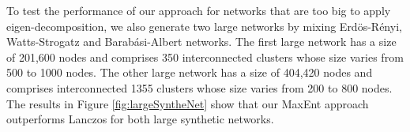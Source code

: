 \documentclass[letterpaper]{article} %
\begin{document}
To test the performance of our approach for networks that are too big to apply eigen-decomposition, we also generate two large networks by mixing Erd{\"o}s-R{\'e}nyi, Watts-Strogatz and Barabási-Albert networks. The first large network has a size of  201,600 nodes and comprises 350 interconnected clusters whose size varies from 500 to 1000 nodes. The other large network has a size of 404,420 nodes and comprises interconnected 1355 clusters whose size varies from 200 to 800 nodes. The results in Figure \ref{fig:largeSyntheNet} show that our MaxEnt approach outperforms Lanczos for both large synthetic networks.
\end{document}
